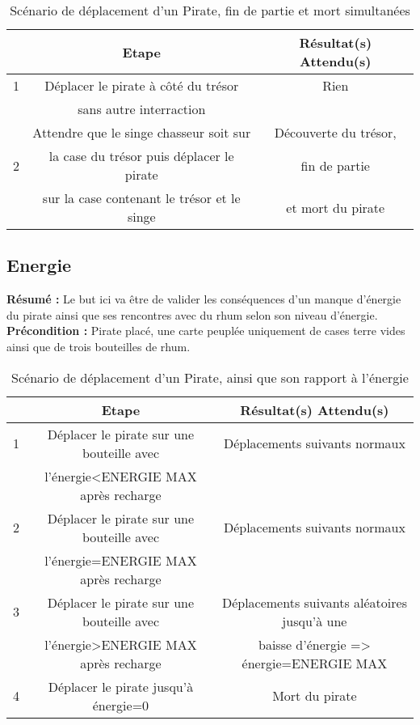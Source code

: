 \begin{table}[!h]
	\begin{center}
		\begin{tabular}{|p{6pt}|c|c|}%
			\hline
			& \textbf{Etape} & \textbf{Résultat(s) Attendu(s)} \\\hline
			1 & Déplacer le pirate à côté du trésor & Rien \\
			 & sans autre interraction &  \\\hline
			 & Attendre que le singe chasseur soit sur & Découverte du trésor,\\
			2 & la case du trésor puis déplacer le pirate &   fin de partie\\
			 & sur la case contenant le trésor et le singe &  et mort du pirate\\\hline
		\end{tabular}
	\end{center}
	\caption{Scénario de déplacement d'un Pirate, fin de partie et mort simultanées}
\end{table}

\newpage
\subsection{Energie}
\label{subsec:piratesEnergie}
\textbf{Résumé :} Le but ici va être de valider les conséquences d'un manque d'énergie du pirate ainsi que ses rencontres avec du rhum selon son niveau d'énergie.\\
\textbf{Précondition :} Pirate placé, une carte peuplée uniquement de cases terre vides ainsi que de trois bouteilles de rhum.
\begin{table}[!h]
	\begin{center}
		\begin{tabular}{|p{6pt}|c|c|}%
			\hline
			& \textbf{Etape} & \textbf{Résultat(s) Attendu(s)} \\\hline
			1 & Déplacer le pirate sur une bouteille avec & Déplacements suivants normaux \\
			 & l'énergie<ENERGIE MAX après recharge & \\\hline

			2 & Déplacer le pirate sur une bouteille avec & Déplacements suivants normaux \\
			 & l'énergie=ENERGIE MAX après recharge & \\\hline
			3 & Déplacer le pirate sur une bouteille avec & Déplacements suivants aléatoires jusqu'à une \\
			 & l'énergie>ENERGIE MAX après recharge & baisse d'énergie => énergie=ENERGIE MAX\\\hline
			4 & Déplacer le pirate jusqu'à énergie=0 & Mort du pirate \\\hline
		\end{tabular}
	\end{center}
	\caption{Scénario de déplacement d'un Pirate, ainsi que son rapport à l'énergie}
\end{table}